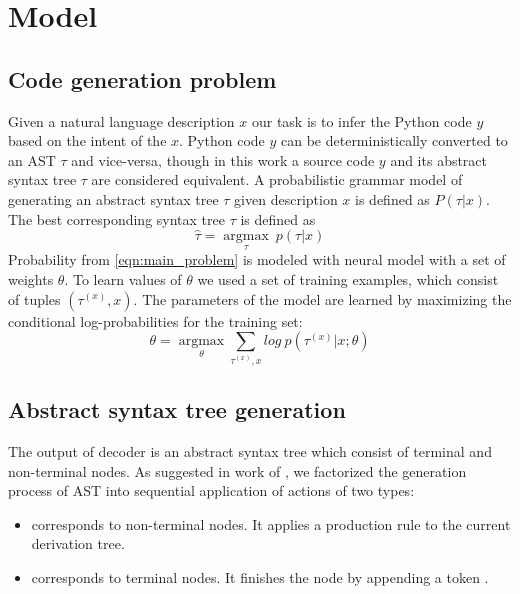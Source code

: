 \chapter{Model} 
\label{Chapter4}

\section{Code generation problem}
Given a natural language description $x$ our task is to infer the Python code $y$ based on the intent of the $x$. Python code $y$ can be deterministically converted to an AST $\tau$ and vice-versa, though in this work a source code $y$ and its abstract syntax tree $\tau$ are considered equivalent. A probabilistic grammar model of generating an abstract syntax tree $\tau$ given description $x$ is defined as $P(\tau|x)$. The best corresponding syntax tree $\tau$ is defined as
\begin{equation}
\hat{\tau}=\underset{\tau}{\operatorname{argmax}}\: p(\tau|x)
\label{eqn:main_problem}
\end{equation}
Probability from \cref{eqn:main_problem} is modeled with neural model with a set of weights $\theta$. To learn values of $\theta$ we used a set of training examples, which consist of tuples $(\tau^{(x)}, x)$. The parameters of the model are learned by maximizing the conditional log-probabilities for the training set:
\begin{equation}
\theta=\underset{\theta}{\operatorname{argmax}} \sum_{\tau^{(x)}, x} log \: p(\tau^{(x)}|x; \theta)
\label{eqn:mle}
\end{equation}

\section{Abstract syntax tree generation} \label{ast_gen}
The output of decoder is an abstract syntax tree which consist of terminal and non-terminal nodes. As suggested in work of \cite{Yin2017}, we factorized the generation process of AST into sequential application of actions of two types:
\begin{itemize}
	\item {} corresponds to non-terminal nodes. It applies a production rule  to the current derivation tree.
	\item {} corresponds to terminal nodes. It finishes the node by appending a token .
\end{itemize}

